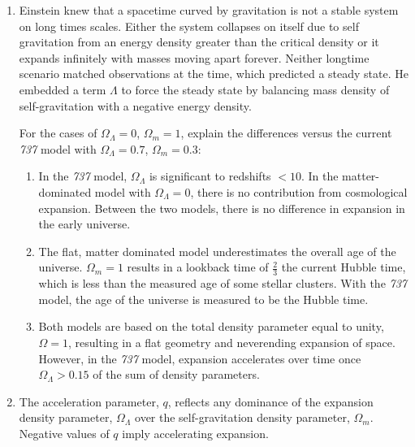 \documentclass{paper}
\begin{document}
\begin{enumerate}
    \item %
      Einstein knew that a spacetime curved by gravitation is not a stable
      system on long times scales. Either the system collapses on itself due
      to self gravitation from an energy density greater than the critical
      density or it expands infinitely with masses moving apart forever.
      Neither longtime scenario matched observations at the time, which
      predicted a steady state. He embedded a term \(\Lambda\) to force the
      steady state by balancing mass density of self-gravitation with a 
      negative energy density.

      For the cases of \(\Omega_{\Lambda}=0\), \(\Omega_m=1\), explain the
      differences versus the current \textit{737} model with 
      \(\Omega_{\Lambda}=0.7\), \(\Omega_m=0.3\):

      \begin{enumerate}
        \item %
          In the \textit{737} model, \(\Omega_\Lambda\) is significant to
          redshifts \(< 10\). In the matter-dominated model with 
          \(\Omega_\Lambda = 0\), there is no contribution from cosmological
          expansion. Between the two models, there is no difference in 
          expansion in the early universe.

        \item %
          The flat, matter dominated model underestimates the overall age of
          the universe. \(\Omega_m = 1\) results in a lookback time of 
          \(\frac{2}{3}\) the current Hubble time, which is less than the
          measured age of some stellar clusters. With the \textit{737}
          model, the age of the universe is measured to be the Hubble time.

        \item %
          Both models are based on the total density parameter equal to
          unity, \(\Omega = 1\), resulting in a flat geometry and neverending
          expansion of space. However, in the \textit{737} model, expansion
          accelerates over time once \(\Omega_\Lambda > 0.15\) of the sum
          of density parameters.

      \end{enumerate}

    \item %
      The acceleration parameter, \(q\), reflects any dominance of the
      expansion density parameter, \(\Omega_\Lambda\) over the 
      self-gravitation density parameter, \(\Omega_m\). Negative values
      of \(q\) imply accelerating expansion.


\end{enumerate}
\end{document}
